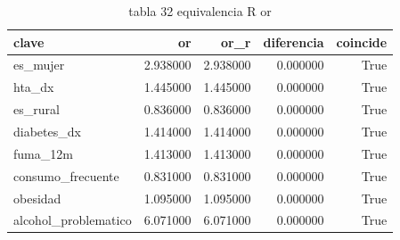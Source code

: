 \begin{table}[htbp]
\caption{tabla 32 equivalencia R or}
\label{tab:tabla_32_equivalencia_R_or}
\begin{tabular}{lrrrr}
\toprule
clave & or & or\_r & diferencia & coincide \\
\midrule
es\_mujer & 2.938000 & 2.938000 & 0.000000 & True \\
hta\_dx & 1.445000 & 1.445000 & 0.000000 & True \\
es\_rural & 0.836000 & 0.836000 & 0.000000 & True \\
diabetes\_dx & 1.414000 & 1.414000 & 0.000000 & True \\
fuma\_12m & 1.413000 & 1.413000 & 0.000000 & True \\
consumo\_frecuente & 0.831000 & 0.831000 & 0.000000 & True \\
obesidad & 1.095000 & 1.095000 & 0.000000 & True \\
alcohol\_problematico & 6.071000 & 6.071000 & 0.000000 & True \\
\bottomrule
\end{tabular}
\end{table}
